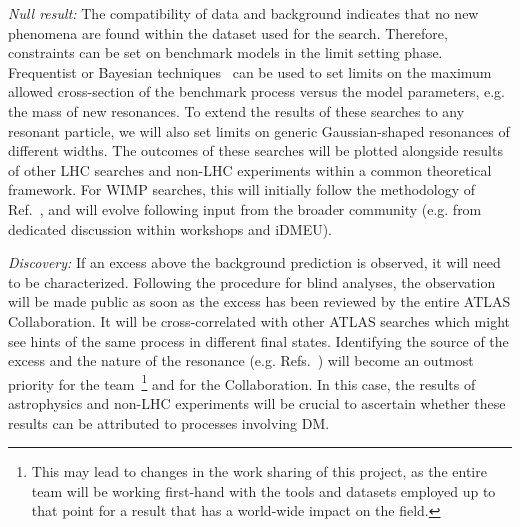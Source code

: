 \textit{Null result:} The compatibility of data and background indicates that no new phenomena are found within the dataset used for the search. 
Therefore, constraints can be set on benchmark models in the limit setting phase. 
Frequentist or Bayesian techniques~\cite{Cowan:2013pha,Caldwell_2009} %
can be used to set limits on the maximum allowed cross-section of the benchmark process versus the model parameters, e.g. the mass of new resonances.
To extend the results of these searches to any resonant particle, we will also set limits on generic Gaussian-shaped resonances of different widths.
The outcomes of these searches will be plotted alongside results of other LHC searches and non-LHC experiments within a common theoretical framework. 
For WIMP searches, this will initially follow the methodology of Ref.~\cite{Aaboud:2018fzt}, %
and will evolve following input from the broader community (e.g. from dedicated discussion within workshops and iDMEU). 

\textit{Discovery:} If an excess above the background prediction is observed, it will need to be characterized. 
Following the procedure for blind analyses, the observation will be made public as soon as the excess has been reviewed by the entire ATLAS Collaboration. 
It will be cross-correlated with other ATLAS searches which might see hints of the same process in different final states. 
Identifying the source of the excess and the nature of the resonance (e.g. Refs.~\cite{Khosa:2019kxd,Chivukula:2014pma}) %
will become an outmost priority for the team~\footnote{This may lead to changes in the work sharing of this project, as the entire team will be working first-hand with the tools and datasets employed up to that point for a result that has a world-wide impact on the field.} and for the Collaboration. 
In this case, the results of astrophysics and non-LHC experiments will be crucial to ascertain whether these results can be attributed to processes involving DM.


